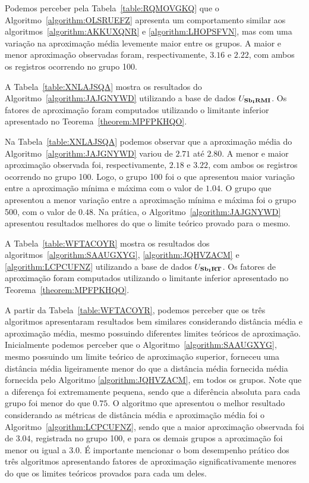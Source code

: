 

Podemos perceber pela Tabela~\ref{table:RQMOVGKQ} que o Algoritmo~\ref{algorithm:OLSRUEFZ} apresenta um comportamento similar aos algoritmos~\ref{algorithm:AKKUXQNR} e \ref{algorithm:LHOPSFVN}, mas com uma variação na aproximação média levemente maior entre os grupos. A maior e menor aproximação observadas foram, respectivamente, $3.16$ e $2.22$, com ambos os registros ocorrendo no grupo 100.

A Tabela~\ref{table:XNLAJSQA} mostra os resultados do Algoritmo~\ref{algorithm:JAJGNYWD} utilizando a base de dados $U_{\textbf{Sb\textsubscript{I}RMI}}{}$. Os fatores de aproximação foram computados utilizando o limitante inferior apresentado no Teorema~\ref{theorem:MPFPKHQO}.



Na Tabela~\ref{table:XNLAJSQA} podemos observar que a aproximação média do Algoritmo~\ref{algorithm:JAJGNYWD} variou de $2.71$ até $2.80$. A menor e maior aproximação observada foi, respectivamente, $2.18$ e $3.22$, com ambos os registros ocorrendo no grupo 100. Logo, o grupo 100 foi o que apresentou maior variação entre a aproximação mínima e máxima com o valor de $1.04$. O grupo que apresentou a menor variação entre a aproximação mínima e máxima foi o grupo 500, com o valor de $0.48$. Na prática, o Algoritmo~\ref{algorithm:JAJGNYWD} apresentou resultados melhores do que o limite teórico provado para o mesmo.

A Tabela~\ref{table:WFTACOYR} mostra os resultados dos algoritmos~\ref{algorithm:SAAUGXYG}, \ref{algorithm:JQHVZACM} e \ref{algorithm:LCPCUFNZ} utilizando a base de dados $U_{\textbf{Sb\textsubscript{I}RT}}{}$. Os fatores de aproximação foram computados utilizando o limitante inferior apresentado no Teorema~\ref{theorem:MPFPKHQO}.



A partir da Tabela~\ref{table:WFTACOYR}, podemos perceber que os três algoritmos apresentaram resultados bem similares considerando distância média e aproximação média, mesmo possuindo diferentes limites teóricos de aproximação. Inicialmente podemos perceber que o Algoritmo~\ref{algorithm:SAAUGXYG}, mesmo possuindo um limite teórico de aproximação superior, forneceu uma distância média ligeiramente menor do que a distância média fornecida média fornecida pelo Algoritmo \ref{algorithm:JQHVZACM}, em todos os grupos. Note que a diferença foi extremamente pequena, sendo que a diferência absoluta para cada grupo foi menor do que $0.75$. O algoritmo que apresentou o melhor resultado considerando as métricas de distância média e aproximação média foi o Algoritmo~\ref{algorithm:LCPCUFNZ}, sendo que a maior aproximação observada foi de $3.04$, registrada no grupo 100, e para os demais grupos a aproximação foi menor ou igual a $3.0$. É importante mencionar o bom desempenho prático dos três algoritmos apresentando fatores de aproximação significativamente menores do que os limites teóricos provados para cada um deles.

